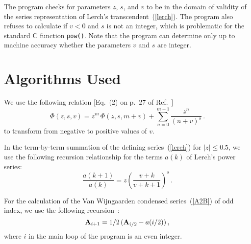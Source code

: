 \documentclass[11pt]{article}
\begin{document}
The program checks for parameters $z$, $s$, and $v$ to be in the domain 
of validity of the series representation of Lerch's transcendent~(\ref{lerch}). 
The program also refuses to calculate if $v<0$ and $s$ is not an integer, 
which is problematic for the standard C function {\tt pow()}.  
Note that the program can determine only up to machine accuracy
whether the parameters $v$ and $s$ are integer.

%
%
\section{Algorithms Used}

We use the following relation [Eq.~(2) on p.~27 of Ref.~\cite{Ba1953vol1}]
%
\begin{equation}
\label{lerchrel}
\Phi(z,s,v) = z^m \, \Phi(z,s,m+v) + 
  \sum_{n=0}^{m-1} \frac{z^n}{(n+v)^s}\,.
\end{equation}
%
to transform from negative to positive values of $v$.

In the term-by-term summation of the defining series~(\ref{lerch}) for 
$|z| \leq 0.5$, we use the following recursion relationship for the 
terms $a(k)$ of Lerch's power series:
%
\begin{equation}
\label{termsrec}
\frac{a(k+1)}{a(k)} = z \left( \frac{v+k}{v+k+1} \right)^s\,.
\end{equation}

For the calculation of the Van Wijngaarden 
condensed series~(\ref{A2B}) of odd index,
we use the following recursion~\cite{JeBeSoAkSaMo2002,Da1969}:
%
\begin{equation}
\label{compute}
{\bf A}_{i+1} = 1/2\,({\bf A}_{i/2} - a(i/2))\,,
\end{equation}
%
where $i$ in the main loop of the program is an even integer.
\end{document}
